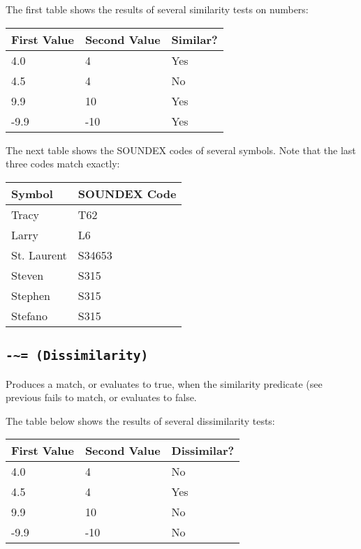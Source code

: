 \Example

The first table shows the results of several similarity tests on
numbers:

\begin{center}
\begin{tabular}{lll}
  \toprule
  First Value & Second Value & Similar? \\
  \midrule
  4.0        & 4            & Yes \\
  4.5        & 4            & No \\
  9.9      & 10           & Yes \\
  -9.9     &   -10          & Yes \\
  \bottomrule
\end{tabular}
\end{center}

The next table shows the SOUNDEX codes of several symbols.  Note that
the last three codes match exactly:

\begin{center}
\begin{tabular}{ll}
  \toprule
  Symbol      & SOUNDEX Code \\
  \midrule
  Tracy       & T62          \\
  Larry       & L6           \\
  St. Laurent & S34653       \\
  Steven      & S315         \\
  Stephen     & S315         \\
  Stefano     & S315         \\
  \bottomrule
\end{tabular}
\end{center}

\subsection{\tt{-\~{}=} (Dissimilarity)}

Produces a match, or evaluates to true, when the similarity predicate
(see previous fails to match, or evaluates to false.

\Example

The table below shows the results of several dissimilarity tests:

\begin{center}
\begin{tabular}{lll}
  \toprule
  First Value & Second Value & Dissimilar? \\
  \midrule
  4.0         & 4            & No          \\
  4.5         & 4            & Yes         \\
  9.9         & 10           & No          \\
  -9.9        & -10          & No          \\
  \bottomrule
\end{tabular}
\end{center}

